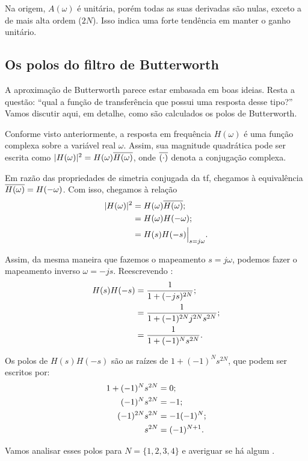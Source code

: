 Na origem, $A(\omega)$ é unitária, porém todas as suas derivadas são nulas, exceto a de mais alta ordem ($2N$). Isso indica uma forte tendência em manter o ganho unitário.

\subsection{Os polos do filtro de Butterworth}

A aproximação de Butterworth parece estar embasada em boas ideias. Resta a questão: \enquote{qual a função de transferência que possui uma resposta desse tipo?} Vamos discutir aqui, em detalhe, como são calculados os polos de Butterworth.

Conforme visto anteriormente, a resposta em frequência $H(\omega)$ é uma função complexa sobre a variável real $\omega$. Assim, sua magnitude quadrática pode ser escrita como $|H(\omega)|^2=H(\omega)\overline{H(\omega)}$, onde $\overline{(\cdot)}$ denota a conjugação complexa.

Em razão das propriedades de simetria conjugada da \ac{tf}, chegamos à equivalência $\overline{H(\omega)}=H(-\omega)$. Com isso, chegamos à relação
\begin{align*}
	|H(\omega)|^2&=H(\omega)\overline{H(\omega)};\\
	&=H(\omega)H(-\omega);\\
	&=H(s)H(-s)\Big|_{s=j\omega}.
\end{align*}

Assim, da mesma maneira que fazemos o mapeamento $s=j\omega$, podemos fazer o mapeamento inverso $\omega=-js$. Reescrevendo :
\begin{align}
	H(s)H(-s)&=\frac{1}{1+(-js)^{2N}};\notag\\
			 &=\frac{1}{1+(-1)^{2N}j^{2N}s^{2N}};\notag\\
			 &=\frac{1}{1+(-1)^Ns^{2N}}.
\end{align}

Os polos de $H(s)H(-s)$ são as raízes de $1+(-1)^Ns^{2N}$, que podem ser escritos por:
\begin{align}
	1+(-1)^Ns^{2N}&=0;\notag\\
	(-1)^Ns^{2N}&=-1;\notag\\
	(-1)^{2N}s^{2N}&=-1(-1)^N;\notag\\
	s^{2N}&=(-1)^{N+1}.
\end{align}

Vamos analisar esses polos para $N=\{1,2,3,4\}$ e averiguar se há algum .


